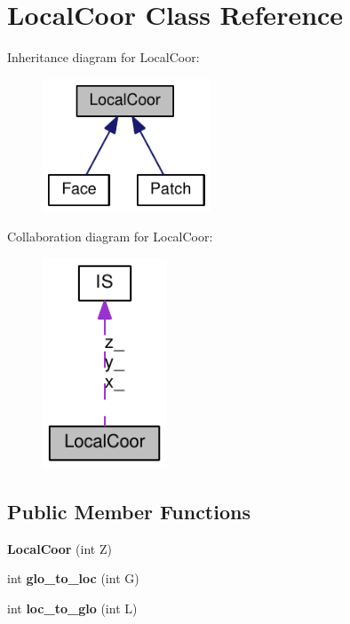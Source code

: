 \hypertarget{classLocalCoor}{
\section{LocalCoor Class Reference}
\label{classLocalCoor}
}
Inheritance diagram for LocalCoor:\nopagebreak
\begin{figure}[H]
\begin{center}
\leavevmode
\includegraphics[width=142pt]{classLocalCoor__inherit__graph}
\end{center}
\end{figure}
Collaboration diagram for LocalCoor:\nopagebreak
\begin{figure}[H]
\begin{center}
\leavevmode
\includegraphics[width=105pt]{classLocalCoor__coll__graph}
\end{center}
\end{figure}
\subsection*{Public Member Functions}
\begin{DoxyCompactItemize}
\item 
\hypertarget{classLocalCoor_a00f6c0c9e48e46f15e1aaf36331fedeb}{
{\bfseries LocalCoor} (int Z)}
\label{classLocalCoor_a00f6c0c9e48e46f15e1aaf36331fedeb}

\item 
\hypertarget{classLocalCoor_ab96f489ba970f19b22e75f94bbec99c1}{
int {\bfseries glo\_\-to\_\-loc} (int G)}
\label{classLocalCoor_ab96f489ba970f19b22e75f94bbec99c1}

\item 
\hypertarget{classLocalCoor_ab5da8e4b3f6c32fbf6636aaa47e04adc}{
int {\bfseries loc\_\-to\_\-glo} (int L)}
\label{classLocalCoor_ab5da8e4b3f6c32fbf6636aaa47e04adc}

\end{DoxyCompactItemize}
